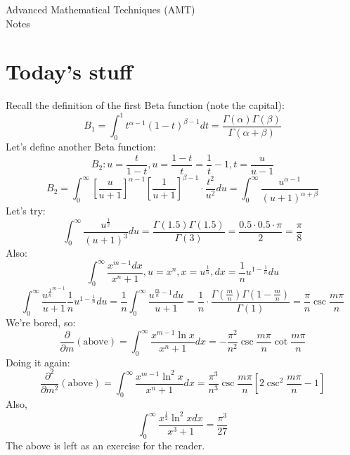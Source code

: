 \documentclass{article}
\begin{document}
\thispagestyle{fancy}
\begin{center}\LARGE{Advanced Mathematical Techniques (AMT) \\ Notes}\end{center}
\section{Today's stuff}
Recall the definition of the first Beta function (note the capital):
\[B_1 = \int_{0}^{1}t^{\alpha - 1}(1-t)^{\beta -1}dt = \frac{\Gamma(\alpha) \Gamma(\beta)}{\Gamma(\alpha + \beta)}\]
Let's define another Beta function:
\[B_2: u = \frac t {1-t}, u = \frac{1-t}t = \frac 1 t - 1, t = \frac u {u-1}\]
\[B_2 = \int_{0}^{\infty} \left[ \frac u {u+1} \right] ^{\alpha - 1} \left[ \frac 1 {u+1} \right] ^{\beta -1} \cdot \frac{t^2}{u^2}du = \int_{0}^{\infty} \frac{u^{\alpha - 1}}{(u+1)^{\alpha + \beta}}\]
Let's try:
\[\int_{0}^{\infty}\frac{u^{\frac 1 2}}{(u+1)^3}du = \frac{\Gamma(1.5)\Gamma(1.5)}{\Gamma(3)} = \frac{0.5 \cdot 0.5 \cdot \pi}{2} = \frac{\pi}{8}\]
Also:
\[\int_{0}^{\infty} \frac{x^{m-1}dx}{x^n + 1}, u = x^n, x = u^{\frac 1 n}, dx = \frac 1 n u^{1 - \frac 1 n}du\]
\[\int_{0}^{\infty} \frac{u^{\frac 1 n^{m-1}}}{u+1}\frac 1 n u^{1-\frac 1 n}du = \frac 1 n \int_{0}^{\infty} \frac{u^{\frac m n -1}du}{u+1} = \frac 1 n \cdot \frac{\Gamma (\frac m n)\Gamma(1 - \frac{m}{n})}{\Gamma(1)} = \frac{\pi}{n} \csc \frac{m\pi}{n}\]
We're bored, so:
\[\frac{\partial}{\partial m}(\text{above}) = \int_{0}^{\infty} \frac{x^{m-1}\ln x}{x^n + 1}dx = -\frac{\pi^2}{n^2}\csc \frac{m\pi}{n}\cot\frac{m\pi}{n}\]
Doing it again:
\[\frac{\partial^2}{\partial m^2}(\text{above}) = \int_{0}^{\infty} \frac{x^{m-1}\ln^2 x}{x^n + 1}dx = \frac{\pi^3}{n^3}\csc \frac{m\pi}{n}\left[ 2 \csc ^2 \frac{m\pi}{n}-1\right]\]
Also, 
\[\int_{0}^{\infty} \frac{x^{\frac 1 2}\ln^2 x dx}{x^3 + 1} = \frac{\pi^3}{27}\]
The above is left as an exercise for the reader.
\end{document}
